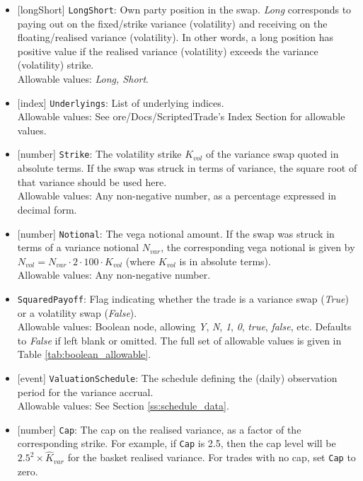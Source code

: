 \begin{itemize}
  \item{}[longShort] \lstinline!LongShort!: Own party position in the swap. \emph{Long} corresponds to paying out on the
  fixed/strike variance (volatility) and receiving on the floating/realised variance (volatility). In other words,
  a long position has positive value if the realised variance (volatility) exceeds the variance (volatility)
  strike. \\
  Allowable values: \emph{Long, Short}.
  \item{}[index] \lstinline!Underlyings!: List of underlying indices. \\
  Allowable values: See ore/Docs/ScriptedTrade's Index Section for allowable values. 
  \item{}[number] \lstinline!Strike!: The volatility strike $K_{vol}$ of the variance swap quoted in absolute terms.
  If the swap was struck in terms of variance, the square root of that variance should be used here. \\
  Allowable values: Any non-negative number, as a percentage expressed in decimal form.
  \item{}[number] \lstinline!Notional!: The vega notional amount. If the swap was struck in terms of a variance notional
  $N_{var}$, the corresponding vega notional is given by $N_{vol} = N_{var} \cdot 2 \cdot 100 \cdot K_{vol}$ (where
  $K_{vol}$ is in absolute terms). \\
  Allowable values: Any non-negative number.
  \item{} \lstinline!SquaredPayoff!: Flag indicating whether the trade is a variance swap (\emph{True})
  or a volatility swap (\emph{False}). \\
  Allowable values: Boolean node, allowing \emph{Y}, \emph{N}, \emph{1}, \emph{0}, \emph{true}, \emph{false}, etc.
  Defaults to \emph{False} if left blank or omitted. The full set of allowable values is given in Table \ref{tab:boolean_allowable}.
  \item{}[event] \lstinline!ValuationSchedule!: The schedule defining the (daily) observation period for the variance accrual. \\
  Allowable values: See Section \ref{ss:schedule_data}.
  \item{}[number] \lstinline!Cap!: The cap on the realised variance, as a factor of the corresponding strike. For example,
  if \lstinline!Cap! is 2.5, then the cap level will be $2.5^2 \times \hat{K}_{var}$ for the basket realised variance.
  For trades with no cap, set \lstinline!Cap! to zero. \\

\end{itemize}
